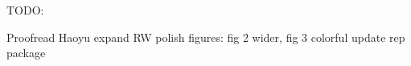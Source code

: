 TODO: 

Proofread
Haoyu expand RW
polish figures: fig 2 wider, fig 3 colorful 
update rep package








































